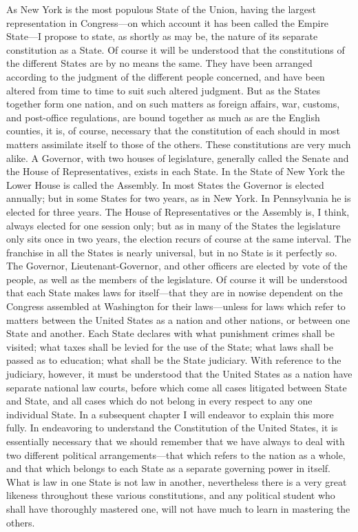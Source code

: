 As New York is the most populous State of the Union, having the
largest representation in Congress---on which account it has been
called the Empire State---I propose to state, as shortly as may be,
the nature of its separate constitution as a State.  Of course it
will be understood that the constitutions of the different States
are by no means the same.  They have been arranged according to the
judgment of the different people concerned, and have been altered
from time to time to suit such altered judgment.  But as the States
together form one nation, and on such matters as foreign affairs,
war, customs, and post-office regulations, are bound together as
much as are the English counties, it is, of course, necessary that
the constitution of each should in most matters assimilate itself
to those of the others.  These constitutions are very much alike.
A Governor, with two houses of legislature, generally called the
Senate and the House of Representatives, exists in each State.  In
the State of New York the Lower House is called the Assembly.  In
most States the Governor is elected annually; but in some States
for two years, as in New York.  In Pennsylvania he is elected for
three years.  The House of Representatives or the Assembly is, I
think, always elected for one session only; but as in many of the
States the legislature only sits once in two years, the election
recurs of course at the same interval.  The franchise in all the
States is nearly universal, but in no State is it perfectly so.
The Governor, Lieutenant-Governor, and other officers are elected
by vote of the people, as well as the members of the legislature.
Of course it will be understood that each State makes laws for
itself---that they are in nowise dependent on the Congress assembled
at Washington for their laws---unless for laws which refer to
matters between the United States as a nation and other nations, or
between one State and another.  Each State declares with what
punishment crimes shall be visited; what taxes shall be levied for
the use of the State; what laws shall be passed as to education;
what shall be the State judiciary.  With reference to the
judiciary, however, it must be understood that the United States as
a nation have separate national law courts, before which come all
cases litigated between State and State, and all cases which do not
belong in every respect to any one individual State.  In a
subsequent chapter I will endeavor to explain this more fully.  In
endeavoring to understand the Constitution of the United States, it
is essentially necessary that we should remember that we have
always to deal with two different political arrangements---that
which refers to the nation as a whole, and that which belongs to
each State as a separate governing power in itself.  What is law in
one State is not law in another, nevertheless there is a very great
likeness throughout these various constitutions, and any political
student who shall have thoroughly mastered one, will not have much
to learn in mastering the others.

